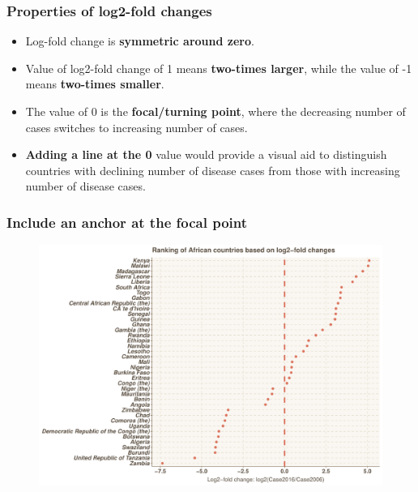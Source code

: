 \documentclass{beamer}
\begin{document}
\begin{frame}\frametitle{Properties of log2-fold changes}
\begin{itemize}
\item Log-fold change is \textbf{symmetric around zero}.
\vspace{0.2in}
\item Value of log2-fold change of 1 means \textbf{two-times larger}, while the value of -1 means \textbf{two-times smaller}.
\vspace{0.2in}
\item The value of 0 is the \textbf{focal/turning point}, where the decreasing number of cases switches to increasing number of cases.
\vspace{0.2in}
\item \textbf{Adding a line at the 0} value would provide a visual aid to distinguish countries with declining number of disease cases from those with increasing number of disease cases.
\end{itemize}
\end{frame}

\begin{frame}\frametitle{Include an anchor at the focal point}
\begin{figure}
\includegraphics[width=0.99\linewidth]{PlotsLec1/LogfoldChangePointChart2}
\end{figure}
\end{frame}
\end{document}
